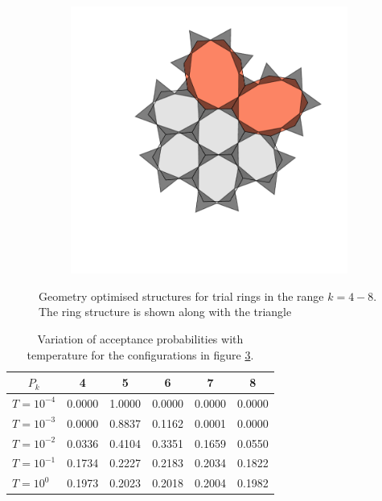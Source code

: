 \begin{figure}[bt]
\begin{subfigure}[b]{0.18\textwidth}
         \caption{}
         \label{fig:triraftalgtrial4}
     \end{subfigure}
     \hfill
      \begin{subfigure}[b]{0.18\textwidth}
         \centering
         \includegraphics[width=\textwidth]{./figures/bilayers/alg_8.pdf}
         \caption{}
         \label{fig:triraftalgtrial5}
     \end{subfigure}
     \hfill
     \caption{Geometry optimised structures for trial rings in the range $k = 4-8$. The ring structure is shown along with the \sioiii{} triangle}
     \label{fig:triraftalgtrial}
    
\end{figure}

\begin{table}[bt]
	\centering
	\caption{Variation of acceptance probabilities with temperature for the configurations in figure \ref{fig:triraftalgtrial}.}
	\label{tab:prob}
	\begin{tabular}{c c c c c c}
	\toprule
	$P_{k}$ & 4 & 5 & 6 & 7 & 8 \\[0.5mm]
	\midrule
	$T=10^{-4}$ & 0.0000 & 1.0000 & 0.0000 & 0.0000 & 0.0000 \\[0.5mm]
	$T=10^{-3}$ & 0.0000 & 0.8837 & 0.1162 & 0.0001 & 0.0000 \\[0.5mm]
	$T=10^{-2}$ & 0.0336& 0.4104 & 0.3351 & 0.1659 & 0.0550 \\[0.5mm]
	$T=10^{-1}$ & 0.1734 & 0.2227 & 0.2183 & 0.2034 & 0.1822 \\[0.5mm]
	$T=10^{0}\;\;$ & 0.1973 & 0.2023 & 0.2018 & 0.2004 & 0.1982 \\[0.5mm] 
	\bottomrule	
	\end{tabular}
\end{table}

